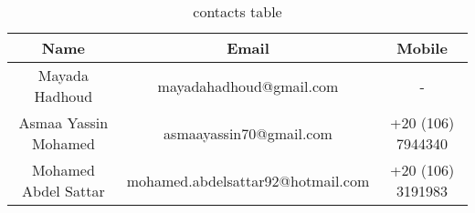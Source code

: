 \begin{table}[ht]
	\centering
	\renewcommand{\arraystretch}{1.5}
	\begin{tabular}[t]{c  c  c}
		Name & Email & Mobile \\
		\hline \hline
		Mayada Hadhoud & mayadahadhoud@gmail.com & -\\
		Asmaa Yassin Mohamed & asmaayassin70@gmail.com & +20 (106) 7944340\\
		Mohamed Abdel Sattar & mohamed.abdelsattar92@hotmail.com & +20 (106) 3191983
	\end{tabular}
	\caption{contacts table}
	\renewcommand{\arraystretch}{1.0}
\end{table}